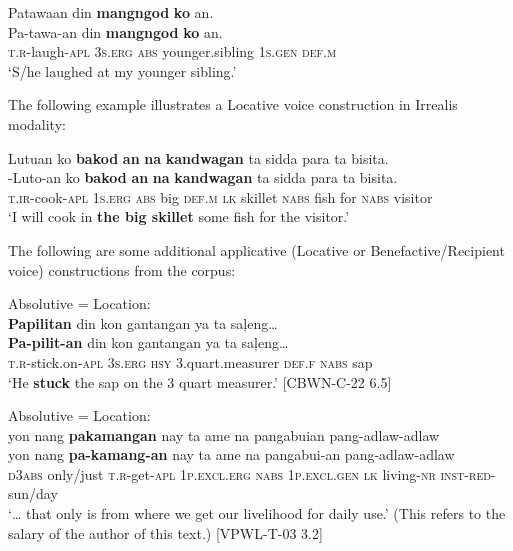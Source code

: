 \ea
\label{bkm:Ref500490264}
Patawaan  din    \textbf{mangngod}  \textbf{ko}  an. \\\smallskip
\gll Pa-tawa-an  din    \emptyset{}  \textbf{mangngod}  \textbf{ko}  an. \\
\textsc{t.r}-laugh-\textsc{apl}  3\textsc{s.erg}    \textsc{abs}  younger.sibling  1\textsc{s.gen}  \textsc{def.m} \\
\glt ‘S/he laughed at my younger sibling.’
\z

The following example illustrates a Locative voice construction in Irrealis modality:

\ea
\label{bkm:Ref500742432}
Lutuan  ko  \textbf{bakod}  \textbf{an}  \textbf{na}  \textbf{kandwagan}  ta  sidda   para  ta  bisita. \\\smallskip
\gll \emptyset{}-Luto-an  ko  \emptyset{}  \textbf{bakod}  \textbf{an}  \textbf{na}  \textbf{kandwagan}  ta  sidda   para  ta  bisita. \\
\textsc{t.ir}-cook-\textsc{apl}  1\textsc{s.erg}  \textsc{abs} big  \textsc{def.m}  \textsc{lk}  skillet  \textsc{nabs}  fish for  \textsc{nabs}  visitor \\
\glt ‘I will cook in \textbf{the big skillet} some fish for the visitor.’
\z

The following are some additional applicative (Locative or Benefactive/Recipient voice) constructions from the corpus:

\ea
Absolutive = Location: \\
\textbf{Papilitan}  din  kon  gantangan  ya  ta  saļeng… \\\smallskip
\gll \textbf{Pa-pilit-an}  din  kon  gantangan  ya  ta  saļeng… \\
\textsc{t.r}-stick.on-\textsc{apl}  3\textsc{s.erg}  \textsc{hsy}  3.quart.measurer  \textsc{def.f}  \textsc{nabs}   sap \\
\glt ‘He \textbf{stuck} the sap on the 3 quart measurer.’ [CBWN-C-22 6.5]
\z

\ea
Absolutive = Location: \\
yon  nang  \textbf{pakamangan}  nay  ta  ame  na pangabuian  pang-adlaw-adlaw \\\smallskip
\gll yon  nang  \textbf{pa-kamang-an}  nay  ta  ame  na pangabui-an  pang-adlaw-adlaw \\
\textsc{d}3\textsc{abs}  only/just  \textsc{t.r}-get-\textsc{apl}  1\textsc{p.excl.erg}  \textsc{nabs}  1\textsc{p.excl.gen}  \textsc{lk} living-\textsc{nr}  \textsc{inst}-\textsc{red}-sun/day \\
\glt `… that only is from where we get our livelihood for daily use.’ (This refers to the salary of the author of this text.) [VPWL-T-03 3.2]
\z

